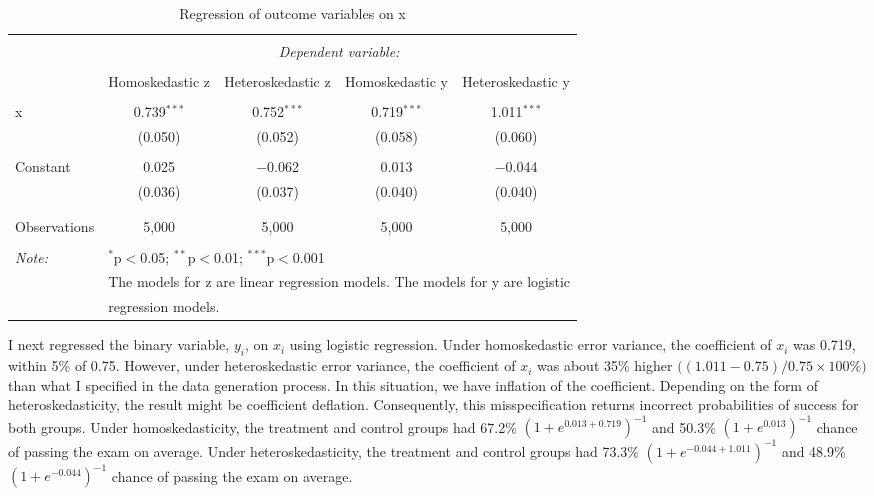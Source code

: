 \documentclass[
  english,
  doc]{apa6}
\begin{document}
\begin{table}[!htbp] \centering 
  \caption{Regression of outcome variables on x} 
  \label{} 
\small 
\begin{tabular}{@{\extracolsep{5pt}}lcccc} 
\\[-1.8ex]\hline 
\hline \\[-1.8ex] 
 & \multicolumn{4}{c}{\textit{Dependent variable:}} \\ 
\cline{2-5} 
\\[-1.8ex] & Homoskedastic z & Heteroskedastic z & Homoskedastic y & Heteroskedastic y \\ 
\hline \\[-1.8ex] 
 x & 0.739$^{***}$ & 0.752$^{***}$ & 0.719$^{***}$ & 1.011$^{***}$ \\ 
  & (0.050) & (0.052) & (0.058) & (0.060) \\ 
  & & & & \\ 
 Constant & 0.025 & $-$0.062 & 0.013 & $-$0.044 \\ 
  & (0.036) & (0.037) & (0.040) & (0.040) \\ 
  & & & & \\ 
\hline \\[-1.8ex] 
Observations & 5,000 & 5,000 & 5,000 & 5,000 \\ 
\hline 
\hline \\[-1.8ex] 
\textit{Note:}  & \multicolumn{4}{l}{$^{*}$p$<$0.05; $^{**}$p$<$0.01; $^{***}$p$<$0.001} \\ 
 & \multicolumn{4}{l}{The models for z are linear regression models. The models for y are logistic} \\ 
 & \multicolumn{4}{l}{regression models.} \\ 
\end{tabular} 
\end{table}

I next regressed the binary variable, \(y_i\), on \(x_i\) using logistic regression. Under homoskedastic error variance, the coefficient of \(x_i\) was 0.719, within 5\% of 0.75. However, under heteroskedastic error variance, the coefficient of \(x_i\) was about 35\% higher \(\big((1.011-0.75)/0.75\times 100\%\big)\) than what I specified in the data generation process. In this situation, we have inflation of the coefficient. Depending on the form of heteroskedasticity, the result might be coefficient deflation. Consequently, this misspecification returns incorrect probabilities of success for both groups. Under homoskedasticity, the treatment and control groups had 67.2\% \((1+e^{0.013+0.719})^{-1}\) and 50.3\% \((1+e^{0.013})^{-1}\) chance of passing the exam on average. Under heteroskedasticity, the treatment and control groups had 73.3\% \((1+e^{-0.044+1.011})^{-1}\) and 48.9\% \((1+e^{-0.044})^{-1}\) chance of passing the exam on average.
\end{document}
